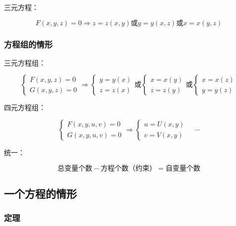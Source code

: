 \documentclass[12pt, a4paper]{article}
\numberwithin{equation}{section}
\begin{document}
    三元方程：

    \[
        F\left(x,y,z\right)=0 \Longrightarrow z=z\left(x,y\right) \text{或} y=y\left(x,z\right)
        \text{或} x=x\left(y,z\right)
    \]
    
\subsubsection{方程组的情形}

    三元方程组：

    $$
        \left\{\begin{array} {l} 
        {F(x,y,z) = 0} \\
        {G(x,y,z) = 0}
        \end{array} \Longrightarrow \left\{\begin{array}{l} 
        {y=y(x)} \\
        {z=z(x)}
        \end{array} \text{或} \left\{\begin{array}{l}
        x=x(y) \\
        z=z(y)
        \end{array}\text{或} \left\{\begin{array}{l}
        x=x(z) \\
        y=y(z)
        \end{array}\right.\right.\right.\right.
    $$

    四元方程组：

    $$
        \left\{\begin{array} {l} 
        {F( x,y,u,v)=0} \\
        {G(x,y,u,v)=0}
        \end{array} \Longrightarrow \left\{\begin{array}{l}
        u=U(x, y) \\
        v=V(x, y)
        \end{array} \quad \cdots
        \right.\right.
    $$

    统一：

    $$
        \text{总变量个数} - \text{方程个数（约束）} = \text{自变量个数}
    $$

\subsection{一个方程的情形}

\subsubsection{定理}
\end{document}
